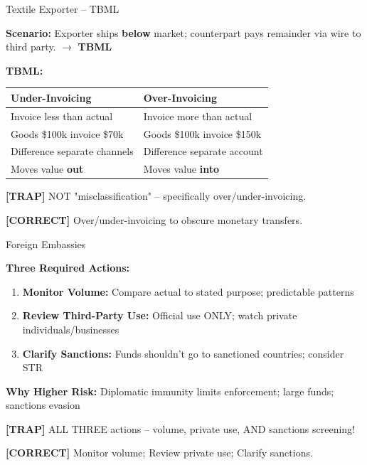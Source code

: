 \documentclass[8pt,aspectratio=169,fontsize=7pt]{beamer}
\renewcommand{\tiny}{\fontsize{4pt}{5pt}\selectfont}
\renewcommand{\normalsize}{\fontsize{8pt}{9pt}\selectfont}
\newcommand{\trap}[1]{%
	\begin{block}{\textcolor{redtrap}{\textbf{[TRAP]}}}
		\textcolor{redtrap}{\tiny #1}
	\end{block}
}
\newcommand{\correct}[1]{%
	\begin{block}{\textcolor{greencorrect}{\textbf{[CORRECT]}}}
		\textcolor{greencorrect}{\tiny #1}
	\end{block}
}
\begin{document}
	\begin{frame}{\normalsize Textile Exporter -- TBML}
		
		\textbf{Scenario:} Exporter ships \textbf{below} market; counterpart pays remainder via wire to third party. $\to$ \textbf{TBML}
		
		\textbf{TBML:}
		\begin{table}
			\begin{tabular}{|p{3.8cm}|p{3.8cm}|}
				\hline
				\textbf{Under-Invoicing} & \textbf{Over-Invoicing} \\
				\hline
				Invoice less than actual & Invoice more than actual \\
				\hline
				Goods \$100k invoice \$70k & Goods \$100k invoice \$150k \\
				\hline
				Difference separate channels & Difference separate account \\
				\hline
				Moves value \textbf{out} & Moves value \textbf{into} \\
				\hline
			\end{tabular}
		\end{table}
		
		\trap{NOT "misclassification" -- specifically over/under-invoicing.}
		
		\correct{Over/under-invoicing to obscure monetary transfers.}
	\end{frame}
	
	\begin{frame}{\normalsize Foreign Embassies}
		
		\textbf{Three Required Actions:}
		\begin{enumerate}
			\item \textbf{Monitor Volume:} Compare actual to stated purpose; predictable patterns
			\item \textbf{Review Third-Party Use:} Official use ONLY; watch private individuals/businesses
			\item \textbf{Clarify Sanctions:} Funds shouldn't go to sanctioned countries; consider STR
		\end{enumerate}
		
		\textbf{Why Higher Risk:} Diplomatic immunity limits enforcement; large funds; sanctions evasion
		
		\trap{ALL THREE actions -- volume, private use, AND sanctions screening!}
		
		\correct{Monitor volume; Review private use; Clarify sanctions.}
	\end{frame}
	
\end{document}
